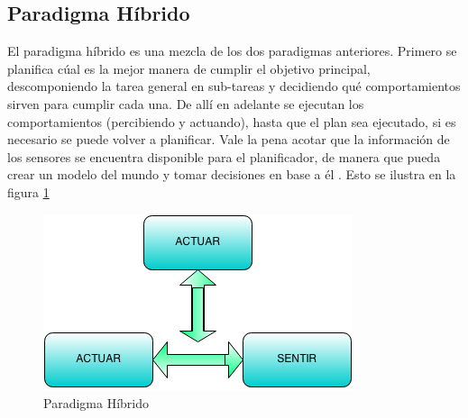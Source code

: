 \subsection{Paradigma Híbrido}
El paradigma híbrido es una mezcla de los dos paradigmas anteriores. Primero se planifica cúal es la mejor manera de cumplir el objetivo principal, descomponiendo la tarea general en sub-tareas y decidiendo qué comportamientos sirven para cumplir cada una. De allí en adelante se ejecutan los comportamientos (percibiendo y actuando), hasta que el plan sea ejecutado, si es necesario se puede volver a planificar. Vale la pena acotar que la información de los sensores se encuentra disponible para el planificador, de manera que pueda crear un modelo del mundo y tomar decisiones en base a él  \cite{AiRobotics}. Esto se ilustra en la figura \ref{fig:hibrido}
\begin{figure}[hbtp]

\centering
\includegraphics[scale=0.7]{imagenes/hibrido.png} 
\caption{Paradigma H\'ibrido}
\label{fig:hibrido}
\end{figure}
